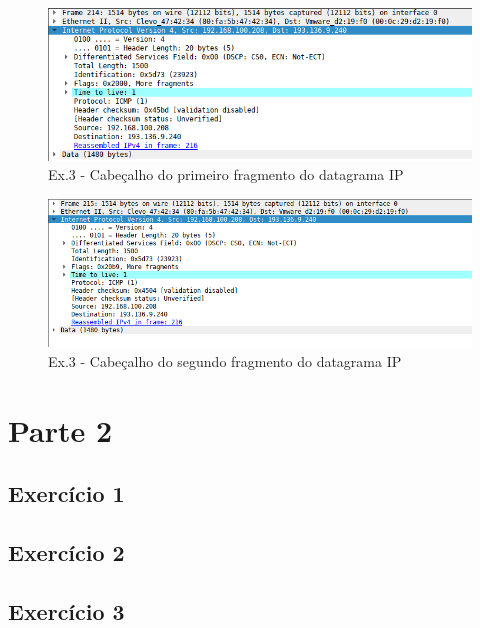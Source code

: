 \documentclass[a4paper]{report}
\begin{document}
\begin{figure}[H]
    \centering 
    \includegraphics[width=\textwidth]{images/fragmentDatagramaIpEx3.png}
    \caption{Ex.3 - Cabeçalho do primeiro fragmento do datagrama IP}
    \label{fig:fragmentDatagramaIpEx3}
\end{figure}

\begin{figure}[H]
    \centering 
    \includegraphics[width=\textwidth]{images/fragment2DatagramaIpEx3.png}
    \caption{Ex.3 - Cabeçalho do segundo fragmento do datagrama IP}
    \label{fig:fragment2DatagramaIpEx3}
\end{figure}

\chapter{Parte 2}
\section{Exercício 1}



\pagebreak
\section{Exercício 2}



\pagebreak
\section{Exercício 3}
\end{document}
